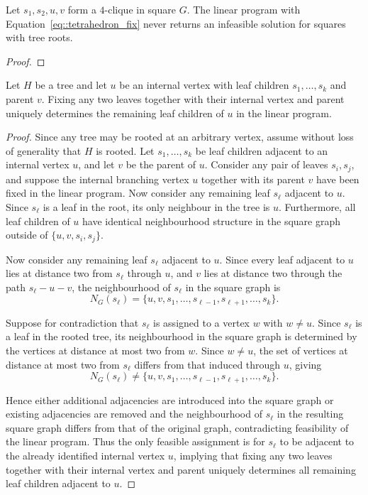\begin{proposition} \label{prop::tetrahedron_decomposition_feasibility}
  Let $s_1,s_2,u,v$ form a $4$-clique in square $G$. The linear program with Equation~\eqref{eq::tetrahedron_fix} never returns an infeasible solution for squares with tree roots. 
\end{proposition}
\begin{proof}
  
\end{proof}

\begin{proposition} \label{prop::tetrahedron_fixing}
  Let $H$ be a tree and let $u$ be an internal vertex with leaf children $s_1,\dots,s_k$ and parent $v$. Fixing any two leaves together with their internal vertex and parent uniquely determines the remaining leaf children of $u$ in the linear program.
\end{proposition}
\begin{proof}
  Since any tree may be rooted at an arbitrary vertex, assume without loss of generality that $H$ is rooted. Let $s_1,\dots,s_k$ be leaf children adjacent to an internal vertex $u$, and let $v$ be the parent of $u$. Consider any pair of leaves $s_i,s_j$, and suppose the internal branching vertex $u$ together with its parent $v$ have been fixed in the linear program. Now consider any remaining leaf $s_\ell$ adjacent to $u$. Since $s_\ell$ is a leaf in the root, its only neighbour in the tree is $u$. Furthermore, all leaf children of $u$ have identical neighbourhood structure in the square graph outside of $\{u,v,s_i,s_j\}$.

  Now consider any remaining leaf $s_\ell$ adjacent to $u$. Since every leaf adjacent to $u$ lies at distance two from $s_\ell$ through $u$, and $v$ lies at distance two through the path $s_\ell-u-v$, the neighbourhood of $s_\ell$ in the square graph is
  \[
  N_G(s_\ell) = \{u,v,s_1,\dots,s_{\ell-1},s_{\ell+1},\dots,s_k\}.
  \]

  Suppose for contradiction that $s_\ell$ is assigned to a vertex $w$ with $w\neq u$. Since $s_\ell$ is a leaf in the rooted tree, its neighbourhood in the square graph is determined by the vertices at distance at most two from $w$. Since $w\neq u$, the set of vertices at distance at most two from $s_\ell$ differs from that induced through $u$, giving
  \[
  N_G(s_\ell)
  \neq
  \{u,v,s_1,\dots,s_{\ell-1},s_{\ell+1},\dots,s_k\}.
  \]

  Hence either additional adjacencies are introduced into the square graph or existing adjacencies are removed and the neighbourhood of $s_\ell$ in the resulting square graph differs from that of the original graph, contradicting feasibility of the linear program. Thus the only feasible assignment is for $s_\ell$ to be adjacent to the already identified internal vertex $u$, implying that fixing any two leaves together with their internal vertex and parent uniquely determines all remaining leaf children adjacent to $u$.
\end{proof}

